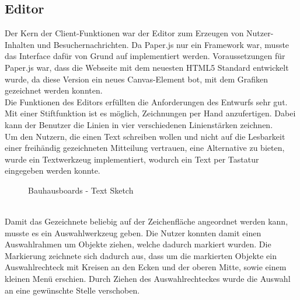 \subsection{Editor}\label{Editor}
Der Kern der Client-Funktionen war der Editor zum Erzeugen von Nutzer-Inhalten und Besuchernachrichten. Da Paper.js nur ein Framework war, musste das Interface dafür von Grund auf implementiert werden.
Voraussetzungen für Paper.js war, dass die Webseite mit dem neuesten HTML5 Standard entwickelt wurde, da diese Version ein neues Canvas-Element bot, mit dem Grafiken gezeichnet werden konnten.
\\
Die Funktionen des Editors erfüllten die Anforderungen des Entwurfs sehr gut.
Mit einer Stiftfunktion ist es möglich, Zeichnungen per Hand anzufertigen. Dabei kann der Benutzer die Linien in vier verschiedenen Linienstärken zeichnen.
\\
Um den Nutzern, die einen Text schreiben wollen und nicht auf die Lesbarkeit einer freihändig gezeichneten Mitteilung vertrauen, eine Alternative zu bieten, wurde ein Textwerkzeug implementiert, wodurch ein Text per Tastatur eingegeben werden konnte.
\begin{figure}
  \centering
  \caption{Bauhausboards - Text Sketch}
  \label{img:editorTextSketch}
\end{figure}
\\
Damit das Gezeichnete beliebig auf der Zeichenfläche angeordnet werden kann, musste es ein Auswahlwerkzeug geben.
Die Nutzer konnten damit einen Auswahlrahmen um Objekte ziehen, welche dadurch markiert wurden.
Die Markierung zeichnete sich dadurch aus, dass um die markierten Objekte ein Auswahlrechteck mit Kreisen an den Ecken und der oberen Mitte, sowie einem kleinen Menü erschien.
Durch Ziehen des Auswahlrechteckes wurde die Auswahl an eine gewünschte Stelle verschoben.

